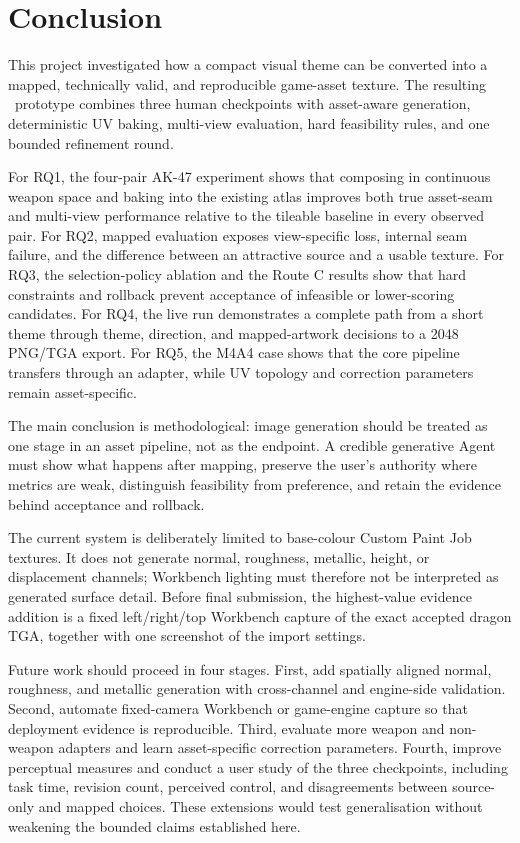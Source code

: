 \section{Conclusion}
\label{sec:conclusion}

This project investigated how a compact visual theme can be converted into a
mapped, technically valid, and reproducible game-asset texture. The resulting
\skinsmith\ prototype combines three human checkpoints with asset-aware
generation, deterministic UV baking, multi-view evaluation, hard feasibility
rules, and one bounded refinement round.

For RQ1, the four-pair AK-47 experiment shows that composing in continuous
weapon space and baking into the existing atlas improves both true asset-seam and
multi-view performance relative to the tileable baseline in every observed pair.
For RQ2, mapped evaluation exposes view-specific loss, internal seam failure, and
the difference between an attractive source and a usable texture. For RQ3, the
selection-policy ablation and the Route C results show that hard constraints and
rollback prevent acceptance of infeasible or lower-scoring candidates. For RQ4,
the live run demonstrates a complete path from a short theme through theme,
direction, and mapped-artwork decisions to a 2048 PNG/TGA export. For RQ5, the
M4A4 case shows that the core pipeline transfers through an adapter, while UV
topology and correction parameters remain asset-specific.

The main conclusion is methodological: image generation should be treated as one
stage in an asset pipeline, not as the endpoint. A credible generative Agent must
show what happens after mapping, preserve the user's authority where metrics are
weak, distinguish feasibility from preference, and retain the evidence behind
acceptance and rollback.

The current system is deliberately limited to base-colour Custom Paint Job
textures. It does not generate normal, roughness, metallic, height, or displacement
channels; Workbench lighting must therefore not be interpreted as generated
surface detail. Before final submission, the highest-value evidence addition is a
fixed left/right/top Workbench capture of the exact accepted dragon TGA, together
with one screenshot of the import settings.

Future work should proceed in four stages. First, add spatially aligned normal,
roughness, and metallic generation with cross-channel and engine-side validation.
Second, automate fixed-camera Workbench or game-engine capture so that deployment
evidence is reproducible. Third, evaluate more weapon and non-weapon adapters and
learn asset-specific correction parameters. Fourth, improve perceptual measures
and conduct a user study of the three checkpoints, including task time, revision
count, perceived control, and disagreements between source-only and mapped
choices. These extensions would test generalisation without weakening the bounded
claims established here.
